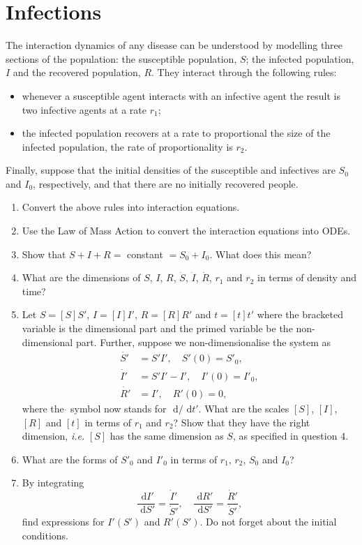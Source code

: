 \documentclass[]{article}
\newcommand{\bb}{\begin{equation}}
\newcommand{\ee}{\end{equation}}
\newcommand{\rd}{\text{ d}}
\newcommand{\ie}{\emph{i.e.} }
\begin{document}
\section{Infections}\label{Infections}
The interaction dynamics of any disease can be understood by modelling three sections of the population: the susceptible population, $S$; the infected population, $I$ and the recovered population, $R$. They interact through the following rules:
\begin{itemize}
\item whenever a susceptible agent interacts with an infective agent the result is two infective agents at a rate $r_1$;
\item the infected population recovers at a rate to proportional the size of the infected population, the rate of proportionality is $r_2$.
\end{itemize}
Finally, suppose that the initial densities of the susceptible and infectives are $S_0$ and $I_0$, respectively, and that there are no initially recovered people.
\begin{enumerate}
\item Convert the above rules into interaction equations.
\item Use the Law of Mass Action to convert the interaction equations into ODEs.
\item Show that $S+I+R=$ constant $=S_0+I_0$. What does this mean?
\item What are the dimensions of $S$, $I$, $R$, $\dot{S}$, $\dot{I}$, $\dot{R}$, $r_1$ and $r_2$ in terms of density and time?
\item Let $S=[S]S'$, $I=[I]I'$, $R=[R]R'$ and $t=[t]t'$ where the bracketed variable is the dimensional part and the primed variable be the non-dimensional part. Further, suppose  we non-dimensionalise the system as
\begin{align}
\dot{S'}&=S'I',\quad S'(0)=S'_0,\nonumber\\
\dot{I'}&=S'I'-I',\quad I'(0)=I'_0,\nonumber\\
\dot{R'}&=I',\quad R'(0)=0,\nonumber
\end{align}
where the $\dot{}$ symbol now stands for $\rd/\rd t'$. What are the scales $[S]$, $[I]$, $[R]$ and $[t]$ in terms of $r_1$ and $r_2$? Show that they have the right dimension, \ie $[S]$ has the same dimension as $S$, as specified in question 4.
\item What are the forms of $S'_0$ and $I'_0$ in terms of $r_1$, $r_2$, $S_0$ and $I_0$?
\item By integrating
\bb
\frac{\rd I'}{\rd S'}=\frac{\dot{I}'}{\dot{S}'},\quad \frac{\rd R'}{\rd S'}=\frac{\dot{R}'}{\dot{S}'},
\ee
find expressions for $I'(S')$ and $R'(S')$. Do not forget about the initial conditions.
\end{enumerate}
\end{document}
